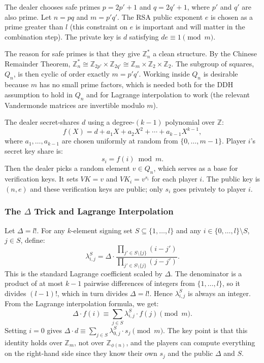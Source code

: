 The dealer chooses safe primes $p = 2p' + 1$ and $q = 2q' + 1$, where $p'$ and $q'$ are
also prime. Let $n = pq$ and $m = p'q'$. The RSA public exponent $e$ is chosen as a
prime greater than $l$ (this constraint on $e$ is important and will matter in the
combination step). The private key is $d$ satisfying $de \equiv 1 \pmod{m}$.

The reason for safe primes is that they give $\mathbb{Z}_n^*$ a clean structure. By the
Chinese Remainder Theorem, $\mathbb{Z}_n^* \cong \mathbb{Z}_{2p'} \times \mathbb{Z}_{2q'}
\cong \mathbb{Z}_m \times \mathbb{Z}_2 \times \mathbb{Z}_2$. The subgroup of squares,
$Q_n$, is then cyclic of order exactly $m = p'q'$. Working inside $Q_n$ is desirable
because $m$ has no small prime factors, which is needed both for the DDH assumption to
hold in $Q_n$ and for Lagrange interpolation to work (the relevant Vandermonde matrices
are invertible modulo $m$).

The dealer secret-shares $d$ using a degree-$(k-1)$ polynomial over $\mathbb{Z}$:
\[
    f(X) = d + a_1 X + a_2 X^2 + \cdots + a_{k-1} X^{k-1},
\]
where $a_1, \ldots, a_{k-1}$ are chosen uniformly at random from $\{0, \ldots, m-1\}$.
Player $i$'s secret key share is:
\[
    s_i = f(i) \bmod m.
\]
Then the dealer picks a random element $v \in Q_n$, which serves as a base for
verification keys. It sets $VK = v$ and $VK_i = v^{s_i}$ for each player $i$. The public
key is $(n, e)$ and these verification keys are public; only $s_i$ goes privately to
player $i$.

\subsubsection{The $\Delta$ Trick and Lagrange Interpolation}

Let $\Delta = l!$. For any $k$-element signing set $S \subseteq \{1, \ldots, l\}$ and
any $i \in \{0, \ldots, l\} \setminus S$, $j \in S$, define:
\[
    \lambda_{i,j}^{S} = \Delta \cdot \frac{\prod_{j' \in S \setminus \{j\}} (i - j')}
    {\prod_{j' \in S \setminus \{j\}} (j - j')}.
\]
This is the standard Lagrange coefficient scaled by $\Delta$. The denominator is a
product of at most $k-1$ pairwise differences of integers from $\{1, \ldots, l\}$, so it
divides $(l-1)!$, which in turn divides $\Delta = l!$. Hence $\lambda_{i,j}^S$ is always
an integer. From the Lagrange interpolation formula, we get:
\[
    \Delta \cdot f(i) \equiv \sum_{j \in S} \lambda_{i,j}^{S} \cdot f(j) \pmod{m}.
    \tag{3}
\]
Setting $i = 0$ gives $\Delta \cdot d \equiv \sum_{j \in S} \lambda_{0,j}^S \cdot s_j
\pmod{m}$. The key point is that this identity holds over $\mathbb{Z}_m$, not over
$\mathbb{Z}_{\phi(n)}$, and the players can compute everything on the right-hand side
since they know their own $s_j$ and the public $\Delta$ and $S$.

